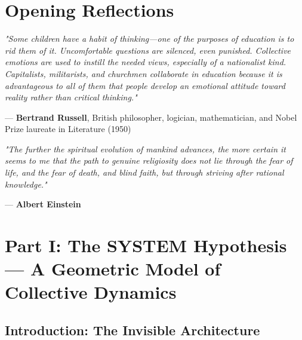 \documentclass[11pt,a4paper]{article}
\newcommand{\SYSTEM}{\textbf{SYSTEM}}
\theoremstyle{definition}
\theoremstyle{remark}
\begin{document}
\tableofcontents
\newpage

\section*{Opening Reflections}

\begin{mdframed}[backgroundcolor=gray!10]
\textit{"Some children have a habit of thinking—one of the purposes of education is to rid them of it. Uncomfortable questions are silenced, even punished. Collective emotions are used to instill the needed views, especially of a nationalist kind. Capitalists, militarists, and churchmen collaborate in education because it is advantageous to all of them that people develop an emotional attitude toward reality rather than critical thinking."}

--- \textbf{Bertrand Russell}, British philosopher, logician, mathematician, and Nobel Prize laureate in Literature (1950)
\end{mdframed}

\vspace{0.5cm}

\begin{mdframed}[backgroundcolor=gray!10]

\textit{"The further the spiritual evolution of mankind advances, the more certain it seems to me that the path to genuine religiosity does not lie through the fear of life, and the fear of death, and blind faith, but through striving after rational knowledge."}

--- \textbf{Albert Einstein} \cite{einstquote}
\end{mdframed}

\newpage


\section{Part I: The \SYSTEM{} Hypothesis — A Geometric Model of Collective Dynamics}

\subsection{Introduction: The Invisible Architecture}
\end{document}
